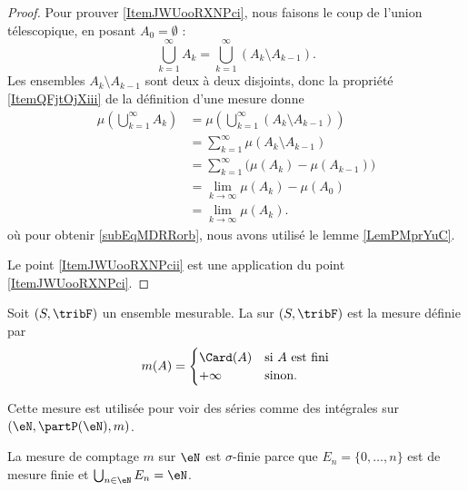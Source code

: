\begin{proof}
    Pour prouver \ref{ItemJWUooRXNPci}, nous faisons le coup de l'union télescopique, en posant \( A_0=\emptyset\) :
    \begin{equation}
        \bigcup_{k=1}^{\infty}A_k=\bigcup_{k=1}^{\infty}(A_k\setminus A_{k-1}).
    \end{equation}
    Les ensembles \( A_k\setminus A_{k-1}\) sont deux à deux disjoints, donc la propriété \ref{ItemQFjtOjXiii} de la définition d'une mesure donne
    \begin{subequations}
        \begin{align}
            \mu(\bigcup_{k=1}^{\infty}A_k)&=\mu\left( \bigcup_{k=1}^{\infty}(A_k\setminus A_{k-1}) \right)\\
            &=\sum_{k=1}^{\infty}\mu(A_k\setminus A_{k-1})\\
            &=   \sum_{k=1}^{\infty}\big( \mu(A_k)-\mu(A_{k-1}) \big)    \label{subEqMDRRorb}\\
            &=\lim_{k\to \infty} \mu(A_k)-\mu(A_0)\\
            &=\lim_{k\to \infty} \mu(A_k).
        \end{align}
    \end{subequations}
    où pour obtenir \ref{subEqMDRRorb}, nous avons utilisé le lemme \ref{LemPMprYuC}.

    Le point \ref{ItemJWUooRXNPcii} est une application du point \ref{ItemJWUooRXNPci}.
\end{proof}

\begin{definition}
    Soit \( (S,\tribF)\) un ensemble mesurable. La  sur \( (S,\tribF)\) est la mesure définie par
    \begin{equation}
        m(A)=\begin{cases}
            \Card(A)    &   \text{si \( A\) est fini}\\
            +\infty    &    \text{sinon}.
        \end{cases}
    \end{equation}
\end{definition}
Cette mesure est utilisée pour voir des séries comme des intégrales sur \( (\eN,\partP(\eN),m)\).

\begin{example}
    La mesure de comptage \( m\) sur \( \eN\) est \( \sigma\)-finie parce que \( E_n=\{ 0,\ldots, n \}\) est de mesure finie et \( \bigcup_{n\in \eN}E_n=\eN\).
\end{example}

